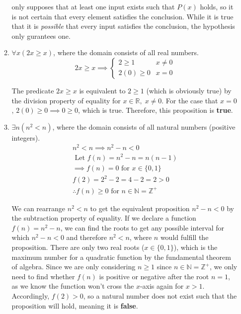\documentclass[letterpaper, 12pt]{article}
\begin{document}
\begin{enumerate}
\begin{enumerate}
\begin{flushleft}
    only supposes that at least one input exists such that $P(x)$ holds, so it is not certain
    that every element satisfies the conclusion. While it is true that it is \textit{possible}
    that every input satisfies the conclusion, the hypothesis only gurantees one.
\end{flushleft}
\item $\forall x (2x \ge x)$, where the domain consists of all real numbers.
\[2x \ge x \implies
\begin{cases}
    2 \ge 1 & x \ne 0 \\
    2(0) \ge 0 & x = 0
\end{cases}\]
\begin{flushleft}
    The predicate $2x \ge x$ is equivalent to $2 \ge 1$ (which is obviously true) by the division
    property of equality for $x \in \mathbb{R}, \; x \ne 0$. For the case that $x = 0$,
    $2(0) \ge 0 \implies 0 \ge 0$, which is true. Therefore, this proposition is \textbf{true}.
\end{flushleft}
\item $\exists n (n^2 < n)$, where the domain consists of all natural numbers (positive integers).
\begin{gather*}
    n^2 < n \implies n^2 - n < 0 \\
    \text{ Let } f(n) = n^2 - n = n(n - 1) \\
    \implies f(n) = 0 \text{ for } x \in \{0, 1\} \\
    f(2) = 2^2 - 2 = 4 - 2 = 2 > 0 \\
    \therefore f(n) \ge 0 \text{ for } n \in \mathbb{N} = \mathbb{Z}^+
\end{gather*}
\begin{flushleft}
    We can rearrange $n^2 < n$ to get the equivalent proposition $n^2 - n < 0$ by the subtraction
    property of equality. If we declare a function $f(n) = n^2 - n$, we can find the roots to get
    any possible interval for which $n^2 - n < 0$ and therefore $n^2 < n$, where $n$ would fulfill
    the proposition. There are only two real roots ($x \in \{0, 1\}$), which is the maximum number
    for a quadratic function by the fundamental theorem of algebra. Since we are only considering
    $n \ge 1$ since $n \in \mathbb{N} = \mathbb{Z}^+$, we only need to find whether $f(n)$ is
    positive or negative after the root $n = 1$, as we know the function won't cross the $x$-axis
    again for $x > 1$. Accordingly, $f(2) > 0$, so a natural number does not exist such that the
    proposition will hold, meaning it is \textbf{false}.

\end{flushleft}
\end{enumerate}
\end{enumerate}
\end{document}
